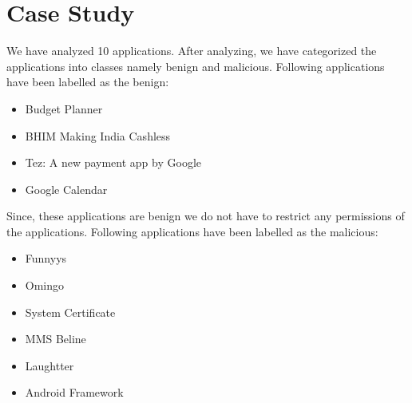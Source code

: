 \chapter{Case Study}
\label{ch:dl}


We have analyzed 10 applications. After analyzing, we have categorized the applications into classes namely benign and malicious. Following applications have been labelled as the benign:
\begin{itemize}
    \item Budget Planner
    \item BHIM Making India Cashless
    \item Tez: A new payment app by Google
    \item Google Calendar
\end{itemize}
Since, these applications are benign we do not have to restrict any permissions of the applications. Following applications have been labelled as the malicious:
\begin{itemize}
    \item Funnyys
    \item Omingo
    \item System Certificate
    \item MMS Beline
    \item Laughtter
    \item Android Framework
\end{itemize}

